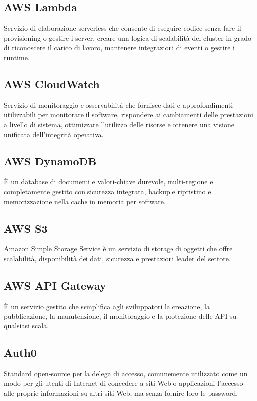 \subsection*{AWS Lambda}
Servizio di elaborazione serverless che consente di eseguire codice senza fare il provisioning o gestire i server, creare una logica di scalabilità del cluster in grado di riconoscere il carico di lavoro, mantenere integrazioni di eventi o gestire i runtime.

\subsection*{AWS CloudWatch}
Servizio di monitoraggio e osservabilità che fornisce dati e approfondimenti utilizzabili per monitorare il software, rispondere ai cambiamenti delle prestazioni a livello di sistema, ottimizzare l'utilizzo delle risorse e ottenere una visione unificata dell'integrità operativa.

\subsection*{AWS DynamoDB}
È un database di documenti e valori-chiave durevole, multi-regione e completamente gestito con sicurezza integrata, backup e ripristino e memorizzazione nella cache in memoria per software.

\subsection*{AWS S3}
Amazon Simple Storage Service è un servizio di storage di oggetti che offre scalabilità, disponibilità dei dati, sicurezza e prestazioni leader del settore.

\subsection*{AWS API Gateway}
È un servizio gestito che semplifica agli sviluppatori la creazione, la pubblicazione, la manutenzione, il monitoraggio e la protezione delle API su qualsiasi scala.

\subsection*{Auth0}
Standard open-source per la delega di accesso, comunemente utilizzato come un modo per gli utenti di Internet di concedere a siti Web o applicazioni l'accesso alle proprie informazioni su altri siti Web, ma senza fornire loro le password.

